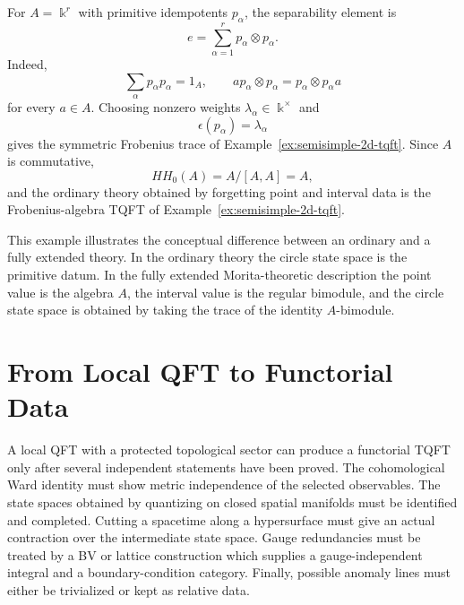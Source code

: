 \begin{example}
\label{ex:extended-semisimple-2d-tqft}
For \(A=\Bbbk^r\) with primitive idempotents \(p_\alpha\), the separability
element is
\[
  e=\sum_{\alpha=1}^r p_\alpha\otimes p_\alpha .
\]
Indeed,
\[
  \sum_\alpha p_\alpha p_\alpha=1_A,
  \qquad
  ap_\alpha\otimes p_\alpha=p_\alpha\otimes p_\alpha a
\]
for every \(a\in A\).  Choosing nonzero weights
\(\lambda_\alpha\in\Bbbk^\times\) and
\[
  \epsilon(p_\alpha)=\lambda_\alpha
\]
gives the symmetric Frobenius trace of
Example~\ref{ex:semisimple-2d-tqft}.  Since \(A\) is commutative,
\[
  HH_0(A)=A/[A,A]=A,
\]
and the ordinary theory obtained by forgetting point and interval data is the
Frobenius-algebra TQFT of Example~\ref{ex:semisimple-2d-tqft}.
\end{example}

This example illustrates the conceptual difference between an ordinary and a
fully extended theory.  In the ordinary theory the circle state space is the
primitive datum.  In the fully extended Morita-theoretic description the
point value is the algebra \(A\), the interval value is the regular
bimodule, and the circle state space is obtained by taking the trace of the
identity \(A\)-bimodule.

\section{From Local QFT to Functorial Data}

A local QFT with a protected topological sector can produce a functorial
TQFT only after several independent statements have been proved.  The
cohomological Ward identity must show metric independence of the selected
observables.  The state spaces obtained by quantizing on closed spatial
manifolds must be identified and completed.  Cutting a spacetime along a
hypersurface must give an actual contraction over the intermediate state
space.  Gauge redundancies must be treated by a BV or lattice construction
which supplies a gauge-independent integral and a boundary-condition
category.  Finally, possible anomaly lines must either be trivialized or kept
as relative data.

